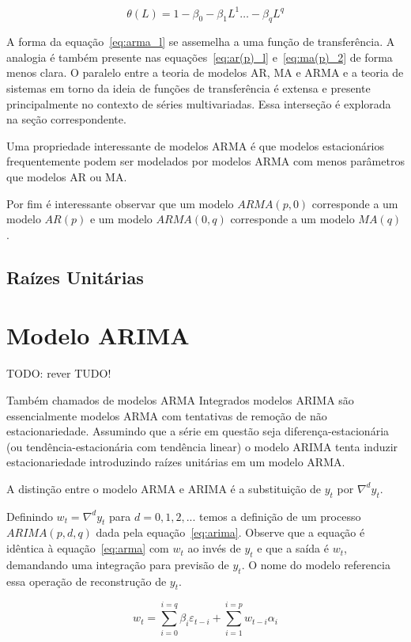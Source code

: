 $$\theta(L) = 1 - \beta_0 - \beta_1 L^1 \hdots - \beta_q L^q$$

A forma da equação~\ref{eq:arma_l} se assemelha a uma função de transferência.
A analogia é também presente nas equações~\ref{eq:ar(p)_l} e~\ref{eq:ma(p)_2}
de forma menos clara. O paralelo entre a teoria de modelos AR, MA e ARMA e a
teoria de sistemas em torno da ideia de funções de transferência é extensa
e presente principalmente no contexto de séries multivariadas. Essa
interseção é explorada na seção correspondente.


Uma propriedade interessante de modelos ARMA é que modelos estacionários
frequentemente podem ser modelados por modelos ARMA com menos parâmetros que
modelos AR ou MA.

Por fim é interessante observar que um modelo $ARMA(p, 0)$ corresponde
a um modelo $AR(p)$ e um modelo $ARMA(0, q)$ corresponde a um modelo
$MA(q)$.

\subsection{Raízes Unitárias}
\label{sec:unit_roots}

\section{Modelo ARIMA}
\label{sec:ARIMA}

TODO: rever TUDO!

Também chamados de modelos ARMA Integrados modelos ARIMA são essencialmente
modelos ARMA com tentativas de remoção de não estacionariedade. Assumindo que
a série em questão seja diferença-estacionária (ou tendência-estacionária
com tendência linear) o modelo ARIMA tenta induzir estacionariedade
introduzindo raízes unitárias em um modelo ARMA.

A distinção entre o modelo ARMA e ARIMA é a substituição de $y_t$ por $\nabla^d
y_t$.

Definindo $w_t = \nabla^d y_t$ para $d = 0, 1, 2, ...$ temos a definição de um
processo $ARIMA(p, d, q)$ dada pela equação~\ref{eq:arima}. Observe que a
equação é idêntica à equação~\ref{eq:arma} com $w_t$ ao invés de $y_t$ e que a
saída é $w_t$, demandando uma integração para previsão de $y_t$. O nome do
modelo referencia essa operação de reconstrução de $y_t$.

\begin{equation}\label{eq:arima}
    w_t = \sum_{i=0}^{i=q} \beta_i \varepsilon_{t-i} + \sum_{i=1}^{i=p} w_{t-i}\alpha_i
\end{equation}

